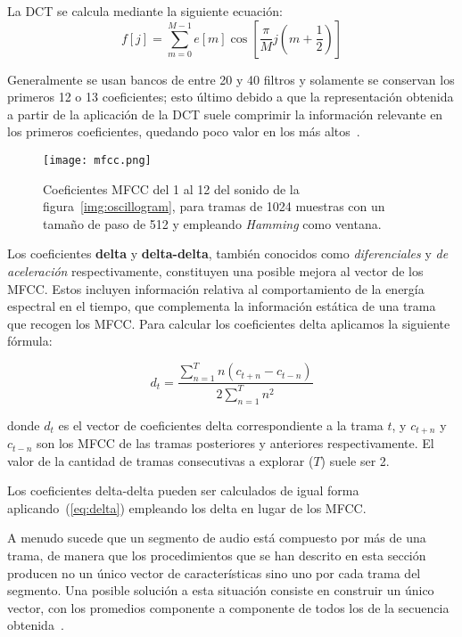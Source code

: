 La DCT se calcula mediante la siguiente ecuación:
\begin{equation}
    \label{eq:DCT}
    f[j] = \sum_{m=0}^{M-1}{e[m]\cos{\left[ \frac{\pi}{M}j\left( m + \frac{1}{2} \right) \right]}}
\end{equation}

Generalmente se usan bancos de entre 20 y 40 filtros y solamente se conservan los primeros 12 o 13 coeficientes;
esto último debido a que la representación obtenida a partir de la aplicación de la DCT suele comprimir la información relevante en los primeros coeficientes, quedando poco valor en los más altos~\cite{Davis80}.

\begin{figure}[!h]
    \centering
    \texttt{[image: mfcc.png]}
    \caption{Coeficientes MFCC del 1 al 12 del sonido de la figura~\ref{img:oscillogram}, para tramas de 1024 muestras con un tamaño de paso de 512 y empleando \textit{Hamming} como ventana.}
    \label{img:mfcc}
\end{figure}

Los coeficientes \textbf{delta} y \textbf{delta-delta}, también conocidos como \textit{diferenciales} y \textit{de aceleración} respectivamente,
constituyen una posible mejora al vector de los MFCC.
Estos incluyen información relativa al comportamiento de la energía espectral en el tiempo, que complementa la información estática de una trama que recogen los MFCC.
Para calcular los coeficientes delta aplicamos la siguiente fórmula:

\begin{equation}
    \label{eq:delta}
    d_t = \frac{\sum_{n=1}^{T}{n(c_{t+n} - c_{t-n})}}{2\sum_{n=1}^{T}{n^2}}
\end{equation}

\noindent
donde $d_t$ es el vector de coeficientes delta correspondiente a la trama $t$, y $c_{t+n}$ y $c_{t-n}$ son los MFCC de las tramas posteriores y anteriores respectivamente.
El valor de la cantidad de tramas consecutivas a explorar ($T$) suele ser 2.

Los coeficientes delta-delta pueden ser calculados de igual forma aplicando~(\ref{eq:delta}) empleando los delta en lugar de los MFCC.

A menudo sucede que un segmento de audio está compuesto por más de una trama, de manera que los procedimientos que se han descrito en esta sección producen no un único vector de características sino uno por cada trama del segmento.
Una posible solución a esta situación consiste en construir un único vector, con los promedios componente a componente de todos los de la secuencia obtenida~\cite{Lee06,Fagerlund07}.